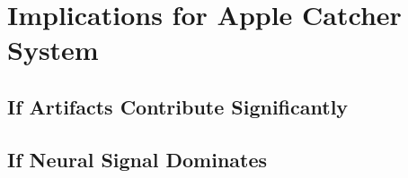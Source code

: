 \section{Implications for Apple Catcher System}
\label{sec:discuss_implications_ac}



\subsection{If Artifacts Contribute Significantly}
\label{subsec:discuss_if_artifacts}

%
%
%
%
%
%
%
%


\subsection{If Neural Signal Dominates}
\label{subsec:discuss_if_neural}

%
%
%
%


